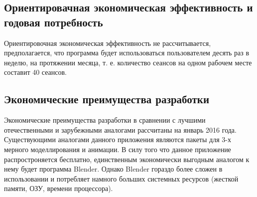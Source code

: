 \subsection{Ориентировачная экономическая эффективность и годовая потребность}
Ориентировочная экономическая эффективность не рассчитывается, предполагается, что программа будет использоваться пользователем десять раз в неделю, на протяжении месяца, т. е. количество сеансов на одном рабочем месте составит 40 сеансов.

\subsection{Экономические преимущества разработки}
Экономические преимущества разработки в сравнении с лучшими отечественными и зарубежными аналогами рассчитаны на январь 2016 года. Существующими аналогами данного приложения являются пакеты для 3-х мерного моделлирования и анимации. В силу того что данное приложение распростроняется бесплатно, единственным экономически выгодным аналогом к нему будет программа Blender. Однако Blender гораздо более сложен в использовании и потребляет намного больших системных ресурсов (жесткой памяти, ОЗУ, времени процессора).
